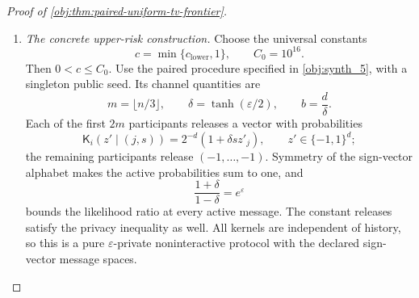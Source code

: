 \begin{proof}[Proof of \cref{obj:thm:paired-uniform-tv-frontier}]
\begin{enumerate}
Now define the two-point amplitude
\[
\alpha_{\mathrm{two}}
=\frac18\min\{1,t^{-1/2}\}\in(0,1/2].
\]
Consider the paired laws with constant contrast zero and constant contrast
\(\alpha_{\mathrm{two}}\). Their targets are zero and
\(\alpha_{\mathrm{two}}/2\).
Applying \cref{obj:lem:adaptive-moment-contraction} at matching order one through the bridge in \cref{obj:prop:signed-causal-bridge} gives
\[
\operatorname{TV}\!\left(
\mathcal L_{P_0,\mathsf K}(R,\mathbf Z^{\mathsf K}),
\mathcal L_{P_{\alpha_{\mathrm{two}}\mathbf1},\mathsf K}
(R,\mathbf Z^{\mathsf K})
\right)
\le
\alpha_{\mathrm{two}}\sqrt n\,\varepsilon
\le\frac18.
\]
Here \(P_{\alpha_{\mathrm{two}}\mathbf1}\) denotes the law with
\(\theta_j=\alpha_{\mathrm{two}}\) for every \(j\).
The preceding decision reduction, with deterministic targets and
\(\omega=1/8\), therefore yields
\[
\mathcal R_{\mathsf K}(\widehat D)
\ge\frac{63\alpha_{\mathrm{two}}^2}{4096}
\ge\frac1{8192}\min\{1,t^{-1}\},
\]
\[
\mathcal H_{\mathsf K}(J_{\mathrm{TV}})
\ge\frac{81\alpha_{\mathrm{two}}}{320}
\ge\frac1{8192}\min\{1,t^{-1/2}\}.
\]
The calibrations use
\[
\alpha_{\mathrm{two}}^2
=\frac1{64}\min\{1,t^{-1}\}.
\]

If \(d\le D_{\mathrm{cut}}\), the elementary upper comparison implies
\[
\rho(t,d)
\le4D_{\mathrm{cut}}^2\min\{1,t^{-1}\},
\]
and taking square roots gives
\[
\sqrt{\rho(t,d)}
\le2D_{\mathrm{cut}}\min\{1,t^{-1/2}\}
\le4D_{\mathrm{cut}}^2\min\{1,t^{-1/2}\}.
\]
Define
\[
c_{\mathrm{small}}=\frac1{32768D_{\mathrm{cut}}^2},
\qquad
c_{\mathrm{lower}}=\min\{c_{\mathrm{large}},c_{\mathrm{small}}\}>0.
\]
The cases \(d\le D_{\mathrm{cut}}\) and \(d>D_{\mathrm{cut}}\) now give, for every sequential paired protocol and every admissible decision,
\[
\mathcal R_{\mathsf K}(\widehat D)\ge
c_{\mathrm{lower}}\rho(t,d),
\qquad
\mathcal H_{\mathsf K}(J_{\mathrm{TV}})\ge
c_{\mathrm{lower}}\sqrt{\rho(t,d)}.
\]
Every noninteractive protocol is sequential. Taking the decision and protocol infima in \cref{obj:def:tv-private-decision-values} therefore proves these lower bounds for both classes.

\item \textit{The concrete upper-risk construction.}
Choose the universal constants
\[
c=\min\{c_{\mathrm{lower}},1\},
\qquad C_0=10^{16}.
\]
Then \(0<c\le C_0\).
Use the paired procedure specified in \cref{obj:synth_5}, with a singleton public seed. Its channel quantities are
\[
m=\lfloor n/3\rfloor,\qquad
\delta=\tanh(\varepsilon/2),\qquad b=\frac d\delta.
\]
Each of the first \(2m\) participants releases a vector with probabilities
\[
\mathsf K_i(z'\mid(j,s))
=2^{-d}(1+\delta s z'_j),
\qquad z'\in\{-1,1\}^d;
\]
the remaining participants release \((-1,\ldots,-1)\).
Symmetry of the sign-vector alphabet makes the active probabilities sum to one, and
\[
\frac{1+\delta}{1-\delta}=e^\varepsilon
\]
bounds the likelihood ratio at every active message. The constant releases satisfy the privacy inequality as well. All kernels are independent of history, so this is a pure \(\varepsilon\)-private noninteractive protocol with the declared sign-vector message spaces.


\end{enumerate}
\end{proof}
